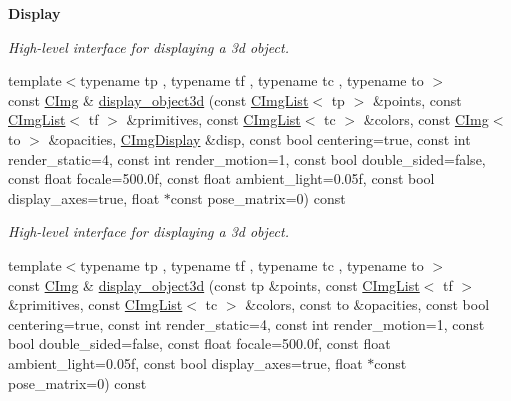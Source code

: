 \begin{Indent}{\bf Display}
\begin{DoxyCompactItemize}
\begin{DoxyCompactList}\small\item\em High-\/level interface for displaying a 3d object. \end{DoxyCompactList}\item 
\hypertarget{structcimg__library_1_1_c_img_afd70a3212a684b0c63fd5a798589d11b}{{\footnotesize template$<$typename tp , typename tf , typename tc , typename to $>$ }\\const \hyperlink{structcimg__library_1_1_c_img}{C\-Img} \& \hyperlink{structcimg__library_1_1_c_img_afd70a3212a684b0c63fd5a798589d11b}{display\-\_\-object3d} (const \hyperlink{structcimg__library_1_1_c_img_list}{C\-Img\-List}$<$ tp $>$ \&points, const \hyperlink{structcimg__library_1_1_c_img_list}{C\-Img\-List}$<$ tf $>$ \&primitives, const \hyperlink{structcimg__library_1_1_c_img_list}{C\-Img\-List}$<$ tc $>$ \&colors, const \hyperlink{structcimg__library_1_1_c_img}{C\-Img}$<$ to $>$ \&opacities, \hyperlink{structcimg__library_1_1_c_img_display}{C\-Img\-Display} \&disp, const bool centering=true, const int render\-\_\-static=4, const int render\-\_\-motion=1, const bool double\-\_\-sided=false, const float focale=500.\-0f, const float ambient\-\_\-light=0.\-05f, const bool display\-\_\-axes=true, float $\ast$const pose\-\_\-matrix=0) const }\label{structcimg__library_1_1_c_img_afd70a3212a684b0c63fd5a798589d11b}

\begin{DoxyCompactList}\small\item\em High-\/level interface for displaying a 3d object. \end{DoxyCompactList}\item 
\hypertarget{structcimg__library_1_1_c_img_a63b486bdfa6dc5a0cadebdb01e0bd32d}{{\footnotesize template$<$typename tp , typename tf , typename tc , typename to $>$ }\\const \hyperlink{structcimg__library_1_1_c_img}{C\-Img} \& \hyperlink{structcimg__library_1_1_c_img_a63b486bdfa6dc5a0cadebdb01e0bd32d}{display\-\_\-object3d} (const tp \&points, const \hyperlink{structcimg__library_1_1_c_img_list}{C\-Img\-List}$<$ tf $>$ \&primitives, const \hyperlink{structcimg__library_1_1_c_img_list}{C\-Img\-List}$<$ tc $>$ \&colors, const to \&opacities, const bool centering=true, const int render\-\_\-static=4, const int render\-\_\-motion=1, const bool double\-\_\-sided=false, const float focale=500.\-0f, const float ambient\-\_\-light=0.\-05f, const bool display\-\_\-axes=true, float $\ast$const pose\-\_\-matrix=0) const }\label{structcimg__library_1_1_c_img_a63b486bdfa6dc5a0cadebdb01e0bd32d}


\end{DoxyCompactItemize}
\end{Indent}
